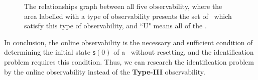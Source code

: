 
\begin{figure}[thpb]
      \centering
     \caption{The relationships graph between all five observability, where the area labelled with a type of observability presents the set of \BCNs\ which satisfy this type of observability, and  ``U" means all of the \BCNs.}
      \label{fig:7}
   \end{figure}

In conclusion, the online observability is the necessary and sufficient condition of determining the initial state $\mathsf{s}(0)$ of a \BCN\  without  resetting, %
and the identification problem requires this condition. Thus, we can research the identification problem by the online observability instead of the {\bf Type-III} observability. 





